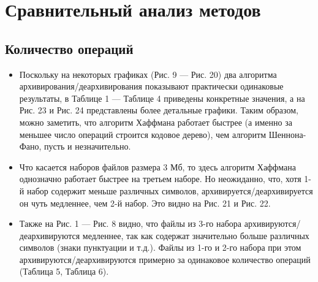\documentclass[a4paper,12pt]{article} %
\begin{document}
    \section{Сравнительный анализ методов}
    \subsection{Количество операций}
    \begin{itemize}
        \item
        Поскольку на некоторых графиках (Рис. 9 --- Рис. 20) два алгоритма архивирования/деархивирования показывают 
        практически одинаковые результаты, в Таблице 1 --- Таблице 4 приведены конкретные значения, а на Рис. 23 и Рис. 24
        представлены более детальные графики. Таким образом, можно заметить, что алгоритм Хаффмана работает быстрее (а 
        именно за меньшее число операций строится кодовое дерево), чем алгоритм Шеннона-Фано, пусть и незначительно. 
        \item
        Что касается наборов файлов размера 3 Мб, то здесь алгоритм Хаффмана однозначно работает быстрее на третьем 
        наборе.
        Но неожиданно, что, хотя 1-й набор содержит меньше различных символов, архивируется/деархивируется он чуть 
        медленнее, чем 2-й набор. Это видно на Рис. 21 и Рис. 22. 
        \item
        Также на Рис. 1 --- Рис. 8 видно, что файлы из 3-го набора архивируются/деархивируются медленнее, так как
        содержат значительно больше различных символов (знаки пунктуации и т.д.). Файлы из 1-го и 2-го набора при этом 
        архивируются/деархивируются примерно за одинаковое  количество операций (Таблица 5, Таблица 6). 
    \end{itemize}
\end{document}
